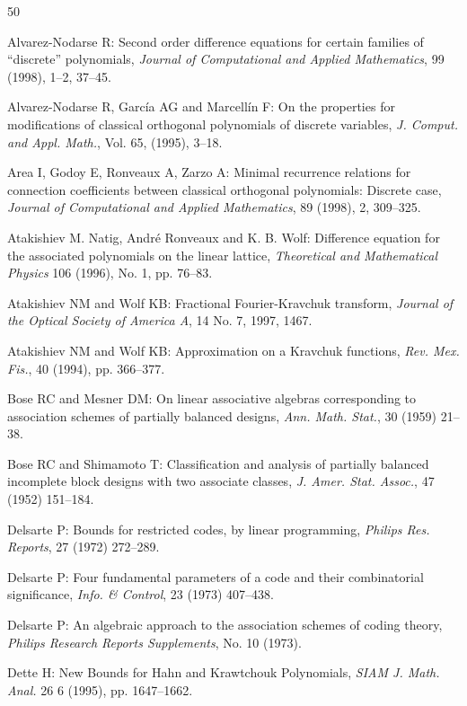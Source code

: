 \begin{thebibliography}{50}

 Alvarez-Nodarse R: Second order difference equations for certain families of ``discrete'' polynomials, \emph{Journal of Computational and Applied Mathematics}, 99 (1998), 1--2, 37--45.

 Alvarez-Nodarse R, Garc\'ia AG and Marcell\'in F: On the properties for modifications of classical orthogonal polynomials of discrete variables, \emph{J. Comput. and Appl. Math.}, Vol. 65, (1995), 3--18.

 Area I, Godoy E, Ronveaux A, Zarzo A: Minimal recurrence relations for connection coefficients between classical orthogonal polynomials: Discrete case, \emph{Journal of Computational and Applied Mathematics}, 89 (1998), 2, 309--325.

 Atakishiev M. Natig, Andr\'e Ronveaux and K. B. Wolf: Difference equation for the associated polynomials on the linear lattice, \emph{Theoretical and Mathematical Physics} 106 (1996), No. 1, pp. 76--83.

 Atakishiev NM and Wolf KB: Fractional Fourier-Kravchuk transform, \emph{Journal of the Optical Society of America A}, 14 No. 7, 1997, 1467.

 Atakishiev NM and Wolf KB: Approximation on a Kravchuk functions, \emph{Rev. Mex. Fis.}, 40 (1994), pp. 366--377.

 Bose RC and Mesner DM: On linear associative algebras corresponding to association schemes of partially balanced designs, \emph{Ann. Math. Stat.}, 30 (1959) 21--38.

 Bose RC and Shimamoto T: Classification and analysis of partially balanced incomplete block designs with two associate classes, \emph{J. Amer. Stat. Assoc.}, 47 (1952) 151--184.

 Delsarte P: Bounds for restricted codes, by linear programming, \emph{Philips Res. Reports}, 27 (1972) 272--289.

 Delsarte P: Four fundamental parameters of a code and their combinatorial significance, \emph{Info. \& Control}, 23 (1973) 407--438.

 Delsarte P: An algebraic approach to the association schemes of coding theory, \emph{Philips Research Reports Supplements}, No. 10 (1973).

 Dette H: New Bounds for Hahn and Krawtchouk Polynomials, \emph{SIAM J. Math. Anal.} 26 6 (1995), pp. 1647--1662.


\end{thebibliography}

